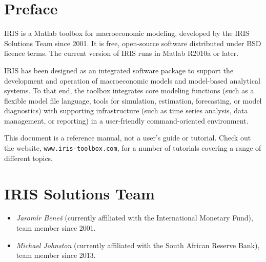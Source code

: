 
\section *{Preface}

IRIS is a Matlab\raisebox{0.3em}{\tiny\textregistered} toolbox for macroeconomic modeling, developed by the IRIS Solutions Team since 2001. It is free, open-source software distributed under BSD licence terms. The current version of IRIS runs in Matlab R2010a or later.

IRIS has been designed as an integrated software package to support the development and operation of macroeconomic models and model-based analytical systems. To that end, the toolbox integrates core modeling functions (such as a flexible model file language, tools for simulation, estimation, forecasting, or model diagnostics) with supporting infrastructure (such as time series analysis, data management, or reporting) in a user-friendly command-oriented environment.

This document is a reference manual, not a user's guide or tutorial. Check out the website, \texttt{www.iris-toolbox.com}, for a number of tutorials covering a range of different topics.

\clearpage

\section*{IRIS Solutions Team}

\begin{itemize}
\item \textit{Jarom\'\i r Bene\v s} (currently affiliated with the International Monetary Fund), team member since 2001.
\item \textit{Michael Johnston} (currently affiliated with the South African Reserve Bank), team member since 2013.
\end{itemize}